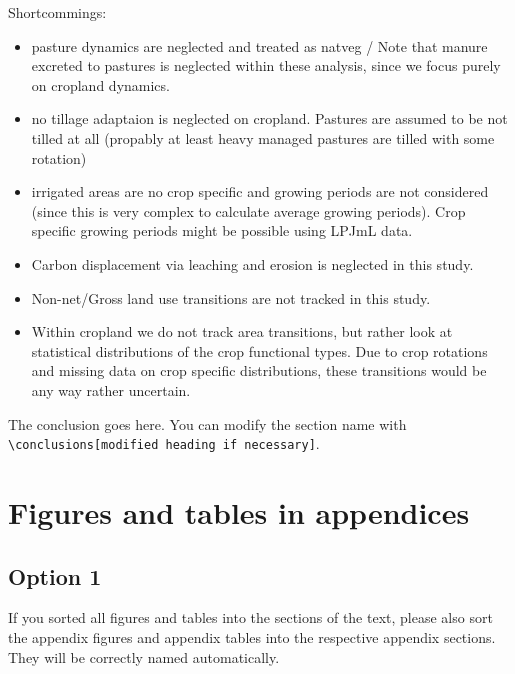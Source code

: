 \documentclass[gc, manuscript]{copernicus}
\begin{document}
Shortcommings:

\begin{itemize}
\item
  pasture dynamics are neglected and treated as natveg / Note that
  manure excreted to pastures is neglected within these analysis, since
  we focus purely on cropland dynamics.
\item
  no tillage adaptaion is neglected on cropland. Pastures are assumed to
  be not tilled at all (propably at least heavy managed pastures are
  tilled with some rotation)
\item
  irrigated areas are no crop specific and growing periods are not
  considered (since this is very complex to calculate average growing
  periods). Crop specific growing periods might be possible using LPJmL
  data.
\item
  Carbon displacement via leaching and erosion is neglected in this
  study.
\item
  Non-net/Gross land use transitions are not tracked in this study.
\item
  Within cropland we do not track area transitions, but rather look at
  statistical distributions of the crop functional types. Due to crop
  rotations and missing data on crop specific distributions, these
  transitions would be any way rather uncertain. \newpage
\end{itemize}

\conclusions

The conclusion goes here. You can modify the section name with
\texttt{\textbackslash{}conclusions{[}modified\ heading\ if\ necessary{]}}.
\newpage








\appendix
\section{Figures and tables in appendices}
\subsection{Option 1}

If you sorted all figures and tables into the sections of the text,
please also sort the appendix figures and appendix tables into the
respective appendix sections. They will be correctly named
automatically.
\end{document}
